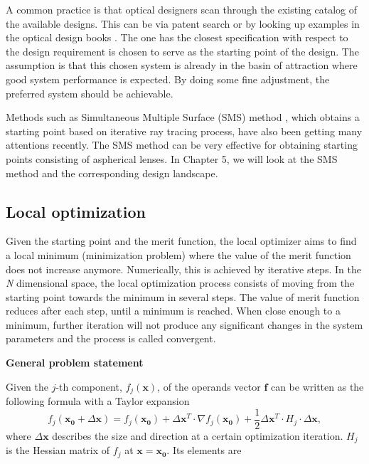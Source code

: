 A common practice is that optical designers scan through the existing catalog of the available designs. This can be via patent search or by looking up examples in the optical design books \cite{smith1992modern} \cite{book:SmithModernOpticalEngineering}.  The one has the closest specification with respect to the design requirement is chosen to serve as the  starting point of the design. The assumption is that this chosen system is already in the basin of attraction where good system performance is expected. By doing some fine adjustment, the preferred system should be achievable. 

Methods such as Simultaneous Multiple Surface (SMS) method \cite{MinanoOE09}, which obtains a starting point based on iterative ray tracing process, have also been getting many attentions recently. The SMS method can be very effective for obtaining starting points consisting of aspherical lenses. In Chapter 5, we will look at the SMS method and the corresponding design landscape. 

\subsection{Local optimization}
\vspace{1em}
Given the starting point and the merit function, the local optimizer aims to find a local minimum (minimization problem) where the value of the merit function does not increase anymore. Numerically, this is achieved by iterative steps. In the \textit{N} dimensional space, the local optimization process consists of moving from the starting point towards the minimum in several steps. The value of merit function reduces after each step, until a minimum is reached. When close enough to a minimum, further iteration will not produce any significant changes in  the system parameters and the process is called convergent. 

\newline

\textbf{General problem statement}

Given the $j$-th component, $f_{j}(\pmb{x})$, of the operands vector $\pmb{f}$ can be written as the following formula with a Taylor expansion 
\begin{equation} \label{mf_taylor_expansion}
f_{j}(\pmb{x_0}+\Delta\pmb{x}) = f_{j}(\pmb{x_0}) + \Delta\pmb{x}^T\cdot \nabla f_{j}(\pmb{x_0}) +\frac{1}{2}\Delta\pmb{x}^T\cdot H_{j} \cdot \Delta\pmb{x},
\end{equation} where $\Delta\pmb{x}$ describes the size and direction at a certain optimization iteration. $H_j$ is the Hessian matrix of $f_j$ at $\pmb{x} = \pmb{x_0}$. Its elements are 

